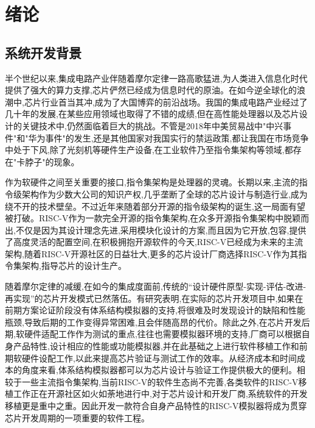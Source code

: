 
\chapter{绪论}

\section{系统开发背景}
半个世纪以来,集成电路产业伴随着摩尔定律一路高歌猛进,为人类进入信息化时代提供了强大的算力支撑,芯片俨然已经成为信息时代的原油。在如今逆全球化的浪潮中,芯片行业首当其冲,成为了大国博弈的前沿战场。我国的集成电路产业经过了几十年的发展,在某些应用领域也取得了不错的成绩,但在高性能处理器以及芯片设计的关键技术中,仍然面临着巨大的挑战\cite{huzhenbo,huzhenbo1}。不管是2018年中美贸易战中"中兴事件"和"华为事件"的发生,还是其他国家对我国实行的禁运政策,都让我国在市场竞争中处于下风,除了光刻机等硬件生产设备,在工业软件乃至指令集架构等领域,都存在"卡脖子"的现象。


作为软硬件之间至关重要的接口,指令集架构是处理器的灵魂。长期以来,主流的指令级架构作为少数大公司的知识产权,几乎垄断了全球的芯片设计与制造行业,成为绕不开的技术壁垒。不过近年来随着部分开源的指令级架构的诞生,这一局面有望被打破。RISC-V作为一款完全开源的指令集架构,在众多开源指令集架构中脱颖而出,不仅是因为其设计理念先进,采用模块化设计的方案,而且因为它开放,包容,提供了高度灵活的配置空间,在积极拥抱开源软件的今天,RISC-V已经成为未来的主流架构,随着RISC-V开源社区的日益壮大,更多的芯片设计厂商选择RISC-V作为其指令集架构,指导芯片的设计生产\cite{包云岗2022开源芯片生态技术体系构建面临的机遇与挑战}。

随着摩尔定律的减缓,在如今的集成度面前,传统的“设计硬件原型-实现-评估-改进-再实现”的芯片开发模式已然落伍\cite{jichengdu}。有研究表明,在实际的芯片开发项目中,如果在前期方案论证阶段没有体系结构模拟器的支持,将很难及时发现设计的缺陷和性能瓶颈,导致后期的工作变得异常困难,且会伴随高昂的代价\cite{buzhou}。除此之外,在芯片开发后期,软硬件适配工作作为测试的重点,往往也需要模拟器环境的支持,厂商可以根据自身产品特性,设计相应的性能或功能模拟器,并在此基础之上进行软件移植工作和前期软硬件设配工作,以此来提高芯片验证与测试工作的效率。从经济成本和时间成本的角度来看,体系结构模拟器都可以为芯片设计与验证工作提供极大的便利。相较于一些主流指令集架构,当前RISC-V的软件生态尚不完善,各类软件的RISC-V移植工作正在开源社区如火如荼地进行中,对于芯片设计和开发厂商,系统软件的开发移植更是重中之重。因此开发一款符合自身产品特性的RISC-V模拟器将成为贯穿芯片开发周期的一项重要的软件工程。


